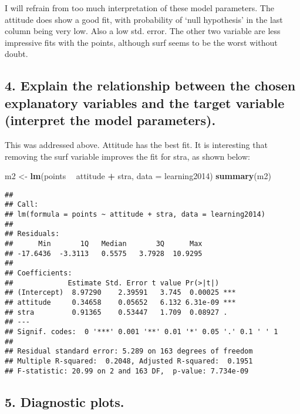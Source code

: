 \documentclass[
]{article}
\newenvironment{Shaded}{\begin{snugshade}}{\end{snugshade}}
\newcommand{\DataTypeTok}[1]{\textcolor[rgb]{0.13,0.29,0.53}{#1}}
\newcommand{\KeywordTok}[1]{\textcolor[rgb]{0.13,0.29,0.53}{\textbf{#1}}}
\newcommand{\NormalTok}[1]{#1}
\newcommand{\OperatorTok}[1]{\textcolor[rgb]{0.81,0.36,0.00}{\textbf{#1}}}
\newcommand{\StringTok}[1]{\textcolor[rgb]{0.31,0.60,0.02}{#1}}
\begin{document}
I will refrain from too much interpretation of these model parameters.
The attitude does show a good fit, with probability of `null hypothesis'
in the last column being very low. Also a low std. error. The other two
variable are less impressive fits with the points, although surf seems
to be the worst without doubt.

\hypertarget{explain-the-relationship-between-the-chosen-explanatory-variables-and-the-target-variable-interpret-the-model-parameters.}{%
\subsection{4. Explain the relationship between the chosen explanatory
variables and the target variable (interpret the model
parameters).}\label{explain-the-relationship-between-the-chosen-explanatory-variables-and-the-target-variable-interpret-the-model-parameters.}}

This was addressed above. Attitude has the best fit. It is interesting
that removing the surf variable improves the fit for stra, as shown
below:

\begin{Shaded}
\begin{Highlighting}[]
\NormalTok{m2 <-}\StringTok{ }\KeywordTok{lm}\NormalTok{(points }\OperatorTok{~}\StringTok{ }\NormalTok{attitude }\OperatorTok{+}\StringTok{ }\NormalTok{stra, }\DataTypeTok{data =}\NormalTok{ learning2014)}
\KeywordTok{summary}\NormalTok{(m2)}
\end{Highlighting}
\end{Shaded}

\begin{verbatim}
## 
## Call:
## lm(formula = points ~ attitude + stra, data = learning2014)
## 
## Residuals:
##      Min       1Q   Median       3Q      Max 
## -17.6436  -3.3113   0.5575   3.7928  10.9295 
## 
## Coefficients:
##             Estimate Std. Error t value Pr(>|t|)    
## (Intercept)  8.97290    2.39591   3.745  0.00025 ***
## attitude     0.34658    0.05652   6.132 6.31e-09 ***
## stra         0.91365    0.53447   1.709  0.08927 .  
## ---
## Signif. codes:  0 '***' 0.001 '**' 0.01 '*' 0.05 '.' 0.1 ' ' 1
## 
## Residual standard error: 5.289 on 163 degrees of freedom
## Multiple R-squared:  0.2048, Adjusted R-squared:  0.1951 
## F-statistic: 20.99 on 2 and 163 DF,  p-value: 7.734e-09
\end{verbatim}

\hypertarget{diagnostic-plots.}{%
\subsection{5. Diagnostic plots.}\label{diagnostic-plots.}}
\end{document}
